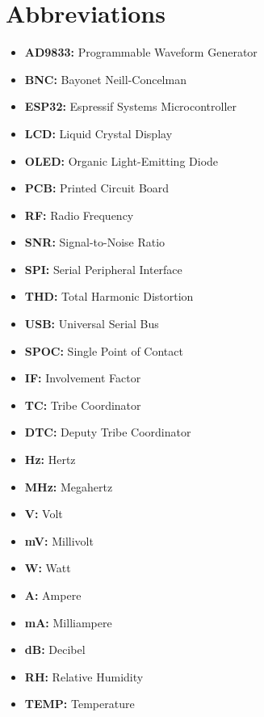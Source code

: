 \documentclass[a4paper,12pt]{article}
\begin{document}

\newpage
\section{Abbreviations}
\begin{itemize}

\item \textbf{AD9833:} Programmable Waveform Generator
\item \textbf{BNC:} Bayonet Neill-Concelman
\item \textbf{ESP32:} Espressif Systems Microcontroller
\item \textbf{LCD:} Liquid Crystal Display
\item \textbf{OLED:} Organic Light-Emitting Diode
\item \textbf{PCB:} Printed Circuit Board
\item \textbf{RF:} Radio Frequency
\item \textbf{SNR:} Signal-to-Noise Ratio
\item \textbf{SPI:} Serial Peripheral Interface
\item \textbf{THD:} Total Harmonic Distortion
\item \textbf{USB:} Universal Serial Bus

\item \textbf{SPOC:} Single Point of Contact
\item \textbf{IF:} Involvement Factor
\item \textbf{TC:} Tribe Coordinator
\item \textbf{DTC:} Deputy Tribe Coordinator

\item \textbf{Hz:} Hertz
\item \textbf{MHz:} Megahertz
\item \textbf{V:} Volt
\item \textbf{mV:} Millivolt
\item \textbf{W:} Watt
\item \textbf{A:} Ampere
\item \textbf{mA:} Milliampere
\item \textbf{dB:} Decibel

\item \textbf{RH:} Relative Humidity
\item \textbf{TEMP:} Temperature


\end{itemize}
\end{document}
